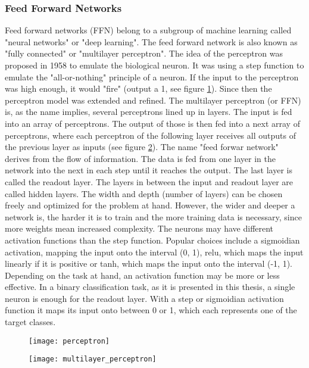 \subsubsection{Feed Forward Networks}
\FloatBarrier
Feed forward networks (FFN) belong to a subgroup of machine learning called "neural networks" or "deep learning". The feed forward network is also known as "fully connected" or "multilayer perceptron". The idea of the perceptron was proposed in 1958 to emulate the biological neuron. It was using a step function to emulate the "all-or-nothing" principle of a neuron. If the input to the perceptron was high enough, it would "fire" (output a 1, see figure \ref{fig:perceptron}). Since then the perceptron model was extended and refined. The multilayer perceptron (or FFN) is, as the name implies, several perceptrons lined up in layers. The input is fed into an array of perceptrons. The output of those is then fed into a next array of perceptrons, where each perceptron of the following layer receives all outputs of the previous layer as inputs (see figure \ref{fig:multilayer_perceptron}). The name "feed forwar network" derives from the flow of information. The data is fed from one layer in the network into the next in each step until it reaches the output. The last layer is called the readout layer. The layers in between the input and readout layer are called hidden layers. The width and depth (number of layers) can be chosen freely and optimized for the problem at hand. However, the wider and deeper a network is, the harder it is to train and the more training data is necessary, since more weights mean increased complexity. The neurons may have different activation functions than the step function. Popular choices include a sigmoidian activation, mapping the input onto the interval (0, 1), relu, which maps the input linearly if it is positive or tanh, which maps the input onto the interval (-1, 1). Depending on the task at hand, an activation function may be more or less effective. 
In a binary classification task, as it is presented in this thesis, a single neuron is enough for the readout layer. With a step or sigmoidian activation function it maps its input onto between 0 or 1, which each represents one of the target classes.
\begin{figure}[ht]
    \centering
    \texttt{[image: perceptron]}
    \label{fig:perceptron}
\end{figure}
\begin{figure}[ht]
    \centering
    \texttt{[image: multilayer\_perceptron]}
    \label{fig:multilayer_perceptron}
\end{figure}

